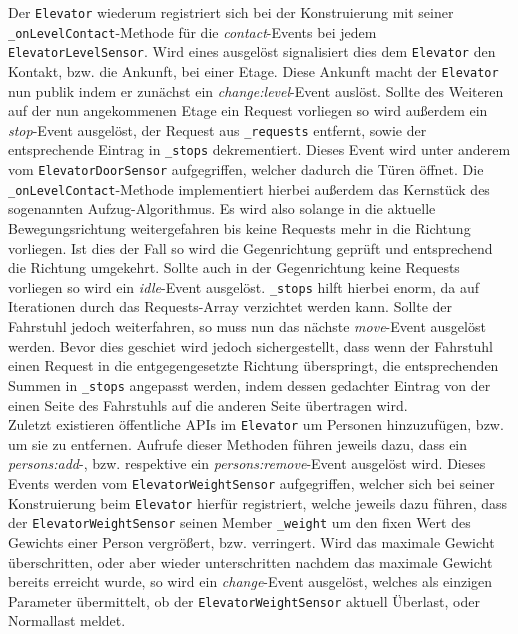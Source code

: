 Der \texttt{Elevator} wiederum registriert sich bei der Konstruierung mit seiner \texttt{\_onLevelContact}-Methode für die \textit{contact}-Events bei jedem \texttt{ElevatorLevelSensor}.
Wird eines ausgelöst signalisiert dies dem \texttt{Elevator} den Kontakt, bzw. die Ankunft, bei einer Etage.
Diese Ankunft macht der \texttt{Elevator} nun publik indem er zunächst ein \textit{change:level}-Event auslöst.
Sollte des Weiteren auf der nun angekommenen Etage ein Request vorliegen so wird außerdem ein \textit{stop}-Event ausgelöst, der Request aus \texttt{\_requests} entfernt, sowie der entsprechende Eintrag in \texttt{\_stops} dekrementiert.
Dieses Event wird unter anderem vom \texttt{ElevatorDoorSensor} aufgegriffen, welcher dadurch die Türen öffnet.
Die \texttt{\_onLevelContact}-Methode implementiert hierbei außerdem das Kernstück des sogenannten Aufzug-Algorithmus.
Es wird also solange in die aktuelle Bewegungsrichtung weitergefahren bis keine Requests mehr in die Richtung vorliegen.
Ist dies der Fall so wird die Gegenrichtung geprüft und entsprechend die Richtung umgekehrt.
Sollte auch in der Gegenrichtung keine Requests vorliegen so wird ein \textit{idle}-Event ausgelöst.
\texttt{\_stops} hilft hierbei enorm, da auf Iterationen durch das Requests-Array verzichtet werden kann.
Sollte der Fahrstuhl jedoch weiterfahren, so muss nun das nächste \textit{move}-Event ausgelöst werden.
Bevor dies geschiet wird jedoch sichergestellt, dass wenn der Fahrstuhl einen Request in die entgegengesetzte Richtung überspringt, die entsprechenden Summen in \texttt{\_stops} angepasst werden, indem dessen gedachter Eintrag von der einen Seite des Fahrstuhls auf die anderen Seite übertragen wird. \\

Zuletzt existieren öffentliche APIs im \texttt{Elevator} um Personen hinzuzufügen, bzw. um sie zu entfernen.
Aufrufe dieser Methoden führen jeweils dazu, dass ein \textit{persons:add}-, bzw. respektive ein \textit{persons:remove}-Event ausgelöst wird.
Dieses Events werden vom \texttt{ElevatorWeightSensor} aufgegriffen, welcher sich bei seiner Konstruierung beim \texttt{Elevator} hierfür registriert, welche jeweils dazu führen, dass der \texttt{ElevatorWeightSensor} seinen Member \texttt{\_weight} um den fixen Wert des Gewichts einer Person vergrößert, bzw. verringert.
Wird das maximale Gewicht überschritten, oder aber wieder unterschritten nachdem das maximale Gewicht bereits erreicht wurde, so wird ein \textit{change}-Event ausgelöst, welches als einzigen Parameter übermittelt, ob der \texttt{ElevatorWeightSensor} aktuell Überlast, oder Normallast meldet. \\


